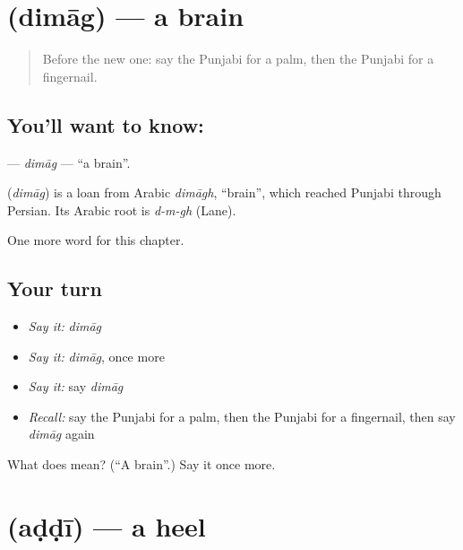 \section[\texorpdfstring{\pa{ਦਿਮਾਗ਼} (dimāg)}{ਦਿਮਾਗ਼ (dimāg)}]{ (dimāg) — a brain}

\label{lesson:PA-C136-dimag}



\begin{quote}
Before the new one: say the Punjabi for a palm, then the Punjabi for a fingernail.
\end{quote}

\subsection*{You'll want to know: }
\textbf{} — \emph{dimāg} — \textquotedblleft{}a brain\textquotedblright{}.

\begin{cousinweb}
\textbf{} (\emph{dimāg}) is a loan from Arabic \emph{dimāgh}, \textquotedblleft{}brain\textquotedblright{}, which reached Punjabi through Persian. Its Arabic root is \emph{d-m-gh} (Lane).
\end{cousinweb}

\begin{grammarlens}[title={What you've built}]
One more word for this chapter.
\end{grammarlens}

\subsection*{Your turn}
\begin{itemize}
\raggedright
  \item \emph{Say it:} \emph{dimāg}
  \item \emph{Say it:} \emph{dimāg}, once more
  \item \emph{Say it:} say \emph{dimāg}
  \item \emph{Recall:} say the Punjabi for a palm, then the Punjabi for a fingernail, then say \emph{dimāg} again
\end{itemize}

\begin{tcolorbox}[breakable,colback=teal!4,colframe=teal!35!black,title={Before you move on}]
What does  mean? (\textquotedblleft{}A brain\textquotedblright{}.) Say it once more.
\end{tcolorbox}
\section[\texorpdfstring{\pa{ਅੱਡੀ} (aḍḍī)}{ਅੱਡੀ (aḍḍī)}]{ (aḍḍī) — a heel}

